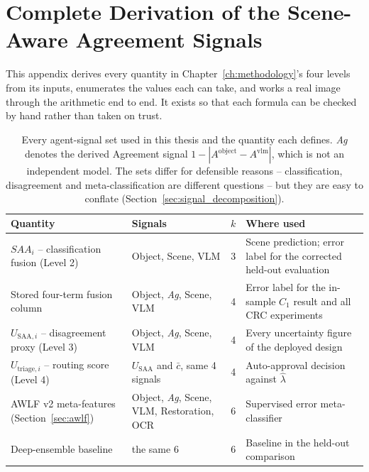 \documentclass[12pt,a4paper]{report}
\begin{document}
\chapter{Complete Derivation of the Scene-Aware Agreement Signals}
\label{app:derivations}

This appendix derives every quantity in Chapter~\ref{ch:methodology}'s four levels from its inputs, enumerates the values each can take, and works a real image through the arithmetic end to end. It exists so that each formula can be checked by hand rather than taken on trust.

\begin{table}[!htbp]
\centering
\caption[Every agent-signal set used in this thesis]{Every agent-signal set used in this thesis and the quantity each defines. \emph{Ag} denotes the derived Agreement signal $1-|A^{\text{object}}-A^{\text{vlm}}|$, which is not an independent model. The sets differ for defensible reasons -- classification, disagreement and meta-classification are different questions -- but they are easy to conflate (Section~\ref{sec:signal_decomposition}).}
\label{tab:signal_sets}
\small
\begin{tabular}{>{\raggedright\arraybackslash}p{4.3cm}>{\raggedright\arraybackslash}p{4.3cm}c>{\raggedright\arraybackslash}p{3.3cm}}
\toprule
\textbf{Quantity} & \textbf{Signals} & \textbf{$k$} & \textbf{Where used} \\
\midrule
$SAA_i$ -- classification fusion (Level 2) & Object, Scene, VLM & 3 & Scene prediction; error label for the corrected held-out evaluation \\
Stored four-term fusion column & Object, \emph{Ag}, Scene, VLM & 4 & Error label for the in-sample $C_1$ result and all CRC experiments \\
$U_{\text{SAA},i}$ -- disagreement proxy (Level 3) & Object, \emph{Ag}, Scene, VLM & 4 & Every uncertainty figure of the deployed design \\
$U_{\text{triage},i}$ -- routing score (Level 4) & $U_{\text{SAA}}$ and $\bar{c}$, same 4 signals & 4 & Auto-approval decision against $\hat\lambda$ \\
AWLF v2 meta-features (Section~\ref{sec:awlf}) & Object, \emph{Ag}, Scene, VLM, Restoration, OCR & 6 & Supervised error meta-classifier \\
Deep-ensemble baseline & the same 6 & 6 & Baseline in the held-out comparison \\
\bottomrule
\end{tabular}
\end{table}
\end{document}
